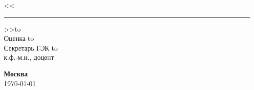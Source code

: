 \begin{titlepage}
{    \hspace*{1.5cm}\hspace*{-3cm}<<\rule{1.5em}{1pt}>>\hbox to\\
    
    \hspace*{1.5cm}\hspace*{-3cm}Оценка \hbox to\maxl{\rule{7em}{1pt}\hfill}\\
    
    \hspace*{1.5cm}\hspace*{-3cm}Секретарь ГЭК 
    \hbox to\hfill\\  
    \hspace*{7.0cm}\hspace*{-3cm}к.ф.-м.н., доцент\hfill\\
    
    }
    
    

    
    
    \vspace{\fill}
    
    \begin{center}
    \textbf{Москва}\\
    \today
    \end{center}

\end{titlepage}
